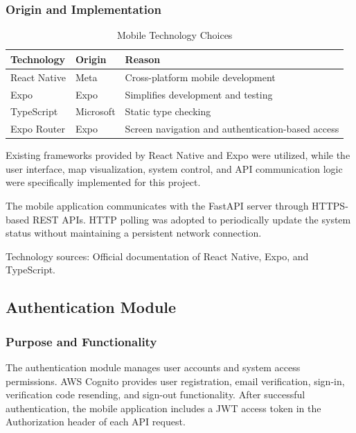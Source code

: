 \documentclass[conference]{IEEEtran}
\newlength{\tablebodywidth}
\begin{document}
\subsubsection{Origin and Implementation}

\begin{table}[!t]
\caption{Mobile Technology Choices}
\label{tab:t5}
\centering\footnotesize
\setlength{\tabcolsep}{3pt}
\setlength{\tablebodywidth}{\dimexpr\columnwidth-18pt\relax}
\begin{tabular}{>{\raggedright\arraybackslash}p{0.333\tablebodywidth}>{\raggedright\arraybackslash}p{0.333\tablebodywidth}>{\raggedright\arraybackslash}p{0.333\tablebodywidth}}
\toprule
\textbf{Technology} & \textbf{Origin} & \textbf{Reason} \\
\midrule
React Native & Meta & Cross-platform mobile development \\
Expo & Expo & Simplifies development and testing \\
TypeScript & Microsoft & Static type checking \\
Expo Router & Expo & Screen navigation and authentication-based access \\
\bottomrule
\end{tabular}
\end{table}

Existing frameworks provided by React Native and Expo were utilized, while the user interface, map visualization, system control, and API communication logic were specifically implemented for this project.

The mobile application communicates with the FastAPI server through HTTPS-based REST APIs. HTTP polling was adopted to periodically update the system status without maintaining a persistent network connection.

Technology sources: Official documentation of React Native, Expo, and TypeScript.

\subsection{Authentication Module \cite{ref15,ref16}}

\subsubsection{Purpose and Functionality}

The authentication module manages user accounts and system access permissions. AWS Cognito provides user registration, email verification, sign-in, verification code resending, and sign-out functionality. After successful authentication, the mobile application includes a JWT access token in the Authorization header of each API request.
\end{document}

